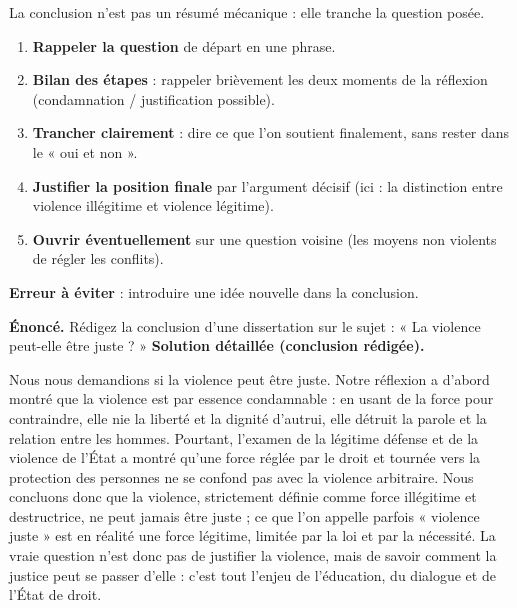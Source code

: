 \documentclass[11pt]{article}
\newcommand{\cle}[1]{{\popxbold\color{popdark}#1}}
\begin{document}
\begin{methode}
La conclusion n'est pas un résumé mécanique : elle tranche la question posée.
\begin{enumerate}
\item \textbf{Rappeler la question} de départ en une phrase.
\item \textbf{Bilan des étapes} : rappeler brièvement les deux moments de la réflexion (condamnation / justification possible).
\item \textbf{Trancher clairement} : dire ce que l'on soutient finalement, sans rester dans le « oui et non ».
\item \textbf{Justifier la position finale} par l'argument décisif (ici : la distinction entre violence illégitime et violence légitime).
\item \textbf{Ouvrir éventuellement} sur une question voisine (les moyens non violents de régler les conflits).
\end{enumerate}
\textbf{Erreur à éviter} : introduire une idée nouvelle dans la conclusion.
\end{methode}

\begin{exoresolu}
\textbf{Énoncé.} Rédigez la conclusion d'une dissertation sur le sujet : « La violence peut-elle être juste ? »
\tcblower
\textbf{Solution détaillée (conclusion rédigée).}

Nous nous demandions si la violence peut être juste. Notre réflexion a d'abord montré que la violence est par essence condamnable : en usant de la force pour contraindre, elle nie la liberté et la dignité d'autrui, elle détruit la parole et la relation entre les hommes. Pourtant, l'examen de la légitime défense et de la violence de l'État a montré qu'une force réglée par le droit et tournée vers la protection des personnes ne se confond pas avec la violence arbitraire. Nous concluons donc que la violence, strictement définie comme force illégitime et destructrice, ne peut jamais être juste ; ce que l'on appelle parfois « violence juste » est en réalité une \cle{force légitime}, limitée par la loi et par la nécessité. La vraie question n'est donc pas de justifier la violence, mais de savoir comment la justice peut se passer d'elle : c'est tout l'enjeu de l'éducation, du dialogue et de l'État de droit.
\end{exoresolu}
\end{document}
